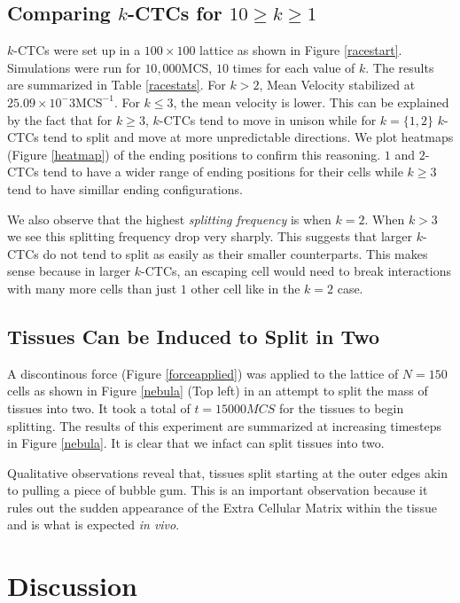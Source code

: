 \documentclass[12pt]{article}
\begin{document}
\subsection{Comparing $k$-CTCs for $10 \geq k\geq1$} %
$k$-CTCs were set up in a $100\times100$ lattice as shown in Figure \ref{racestart}. Simulations were run for $10,000$MCS, $10$ times for each value of $k$. The results are summarized in Table \ref{racestats}. For $k>2$, Mean Velocity stabilized at $25.09\times10^-3\text{MCS}^{-1}$. For $k\leq3$, the mean velocity is lower. This can be explained by the fact that for $k\geq3$, $k$-CTCs tend to move in unison while for $k=\{1,2\}$ $k$-CTCs tend to split and move at more unpredictable directions. We plot heatmaps (Figure \ref{heatmap}) of the ending positions to confirm this reasoning. $1$ and $2$-CTCs tend to have a wider range of ending positions for their cells while $k\geq3$ tend to have simillar ending configurations.

We also observe that the highest \emph{splitting frequency} is when $k=2$. When $k>3$ we see this splitting frequency drop very sharply. This suggests that larger $k$-CTCs do not tend to split as easily as their smaller counterparts. This makes sense because in larger $k$-CTCs, an escaping cell would need to break interactions with many more cells than just $1$ other cell like in the $k=2$ case.

\subsection{Tissues Can be Induced to Split in Two}
A discontinous force (Figure \ref{forceapplied}) was applied to the lattice of $N=150$ cells as shown in Figure \ref{nebula} (Top left) in an attempt to split the mass of tissues into two. It took a total of $t=15000MCS$ for the tissues to begin splitting. The results of this experiment are summarized at increasing timesteps in Figure \ref{nebula}. It is clear that we infact can split tissues into two.

Qualitative observations reveal that, tissues split starting at the outer edges akin to pulling a piece of bubble gum. This is an important observation because it rules out the sudden appearance of the Extra Cellular Matrix within the tissue and is what is expected \emph{in vivo}.
\section{Discussion}
\end{document}
